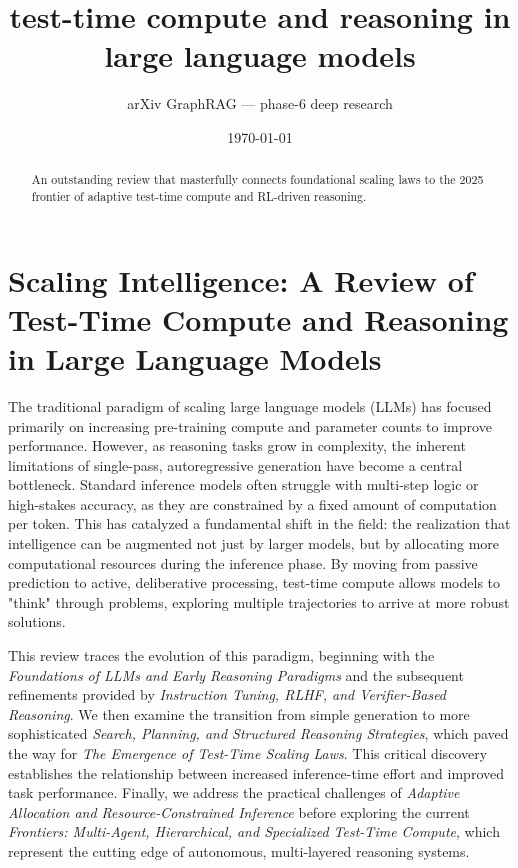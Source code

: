 \documentclass[11pt]{article}
\title{test-time compute and reasoning in large language models}
\author{arXiv GraphRAG --- phase-6 deep research}
\date{\today}
\begin{document}
\maketitle

\begin{abstract}
An outstanding review that masterfully connects foundational scaling laws to the 2025 frontier of adaptive test-time compute and RL-driven reasoning.
\end{abstract}

\section{Scaling Intelligence: A Review of Test-Time Compute and Reasoning in Large Language Models}

The traditional paradigm of scaling large language models (LLMs) has focused primarily on increasing pre-training compute and parameter counts to improve performance. However, as reasoning tasks grow in complexity, the inherent limitations of single-pass, autoregressive generation have become a central bottleneck. Standard inference models often struggle with multi-step logic or high-stakes accuracy, as they are constrained by a fixed amount of computation per token. This has catalyzed a fundamental shift in the field: the realization that intelligence can be augmented not just by larger models, but by allocating more computational resources during the inference phase. By moving from passive prediction to active, deliberative processing, test-time compute allows models to "think" through problems, exploring multiple trajectories to arrive at more robust solutions.

This review traces the evolution of this paradigm, beginning with the \textit{Foundations of LLMs and Early Reasoning Paradigms} and the subsequent refinements provided by \textit{Instruction Tuning, RLHF, and Verifier-Based Reasoning}. We then examine the transition from simple generation to more sophisticated \textit{Search, Planning, and Structured Reasoning Strategies}, which paved the way for \textit{The Emergence of Test-Time Scaling Laws}. This critical discovery establishes the relationship between increased inference-time effort and improved task performance. Finally, we address the practical challenges of \textit{Adaptive Allocation and Resource-Constrained Inference} before exploring the current \textit{Frontiers: Multi-Agent, Hierarchical, and Specialized Test-Time Compute}, which represent the cutting edge of autonomous, multi-layered reasoning systems.
\end{document}
